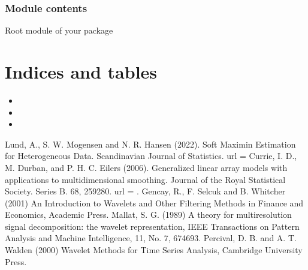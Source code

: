 \documentclass[letterpaper,10pt,english]{sphinxmanual}
\begin{document}
\subsection{Module contents}
\label{\detokenize{pysmme:module-pysmme}}\label{\detokenize{pysmme:module-contents}}
\sphinxAtStartPar
Root module of your package


\chapter{Indices and tables}
\label{\detokenize{index:indices-and-tables}}\begin{itemize}
\item {} 
\sphinxAtStartPar
{}

\item {} 
\sphinxAtStartPar
{}

\item {} 
\sphinxAtStartPar
{}

\end{itemize}

\begin{sphinxthebibliography}{1}
\sphinxAtStartPar
Lund, A., S. W. Mogensen and N. R. Hansen (2022). Soft Maximin Estimation for
Heterogeneous Data. Scandinavian Journal of Statistics. url = 
\sphinxAtStartPar
Currie, I. D., M. Durban, and P. H. C. Eilers (2006). Generalized linear
array models with applications to multidimensional smoothing.
Journal of the Royal Statistical Society. Series B. 68, 
259\sphinxhyphen{}280. url = .
\sphinxAtStartPar
Gencay, R., F. Selcuk and B. Whitcher (2001) An Introduction to Wavelets and
Other Filtering Methods in Finance and Economics, Academic Press.
\sphinxAtStartPar
Mallat, S. G. (1989) A theory for multiresolution signal decomposition: the
wavelet representation, IEEE Transactions on Pattern Analysis and Machine
Intelligence, 11, No. 7, 674\sphinxhyphen{}693.
\sphinxAtStartPar
Percival, D. B. and A. T. Walden (2000) Wavelet Methods for Time Series
Analysis, Cambridge University Press.
\end{sphinxthebibliography}
\end{document}
